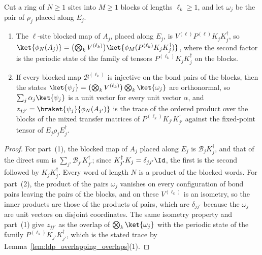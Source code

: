 \begin{lemma}
    \label{lem:ldp_overlapping_block_states}
    \leanok
    Cut a ring of $N\geq1$ sites into $M\geq1$ blocks of lengths $\ell_k\geq1$,
    and let $\omega_j$ be the pair of $\rho_j$ placed along $E_j$.
    \begin{enumerate}
        \item The $\ell$-site blocked map of $A_j$, placed along $E_j$, is
              $V^{(\ell)}P^{(\ell)}K_jK_j^\dagger$, so
              $\ket{\phi_N(A_j)}=\bigl(\bigotimes_kV^{(\ell_k)}\bigr)
                  \ket{\phi_M(P^{(\ell_k)}K_jK_j^\dagger)}$, where the second
              factor is the periodic state of the family of tensors
              $P^{(\ell_k)}K_jK_j^\dagger$ on the blocks.
        \item If every blocked map $\mathcal B^{(\ell_k)}$ is injective on the
              bond pairs of the blocks, then the states
              $\ket{\psi_j}=\bigl(\bigotimes_kV^{(\ell_k)}\bigr)
                  \bigotimes_k\ket{\omega_j}$ are orthonormal, so
              $\sum_j\alpha_j\ket{\psi_j}$ is a unit vector for every unit vector
              $\alpha$, and
              $z_{jj'}=\braket{\psi_j}{\phi_N(A_{j'})}$ is the trace of the
              ordered product over the blocks of the mixed transfer matrices of
              $P^{(\ell_k)}K_{j'}K_{j'}^\dagger$ against the fixed-point tensor
              of $E_j\rho_jE_j^\dagger$.
    \end{enumerate}
\end{lemma}
\begin{proof}
    \leanok
    For part~(1), the blocked map of $A_j$ placed along $E_j$ is
    $\mathcal B_jK_j^\dagger$, and that of the direct sum is
    $\sum_{j'}\mathcal B_{j'}K_{j'}^\dagger$; since
    $K_{j'}^\dagger K_j=\delta_{jj'}\Id$, the first is the second followed by
    $K_jK_j^\dagger$. Every word of length $N$ is a product of the blocked
    words. For part~(2), the product of the pairs $\omega_j$ vanishes on every
    configuration of bond pairs leaving the pairs of the blocks, and on these
    $V^{(\ell_k)}$ is an isometry, so the inner products are those of the
    products of pairs, which are $\delta_{jj'}$ because the $\omega_j$ are unit
    vectors on disjoint coordinates. The same isometry property and part~(1)
    give $z_{jj'}$ as the overlap of $\bigotimes_k\ket{\omega_j}$ with the
    periodic state of the family $P^{(\ell_k)}K_{j'}K_{j'}^\dagger$, which is the
    stated trace by Lemma~\ref{lem:ldp_overlapping_overlaps}(1).
\end{proof}


